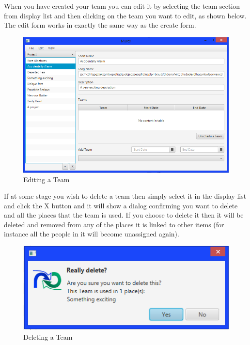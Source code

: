 When you have created your team you can edit it by selecting the team section from display list and then clicking on the team you want to edit, as shown below. The edit form works in exactly the same way as the create form.

\begin{figure}[H]
\centering
\includegraphics[width=\textwidth]{images/screenshots/teams4.PNG}
\caption{Editing a Team}
\label{fig:new_project}
\end{figure}

If at some stage you wish to delete a team then simply select it in the display list and click the X button and it will show a dialog confirming you want to delete and all the places that the team is used. If you choose to delete it then it will be deleted and removed from any of the places it is linked to other items (for instance all the people in it will become unassigned again).

\begin{figure}[H]
\centering
\includegraphics[width=\textwidth]{images/screenshots/teams5.PNG}
\caption{Deleting a Team}
\label{fig:new_project}
\end{figure}